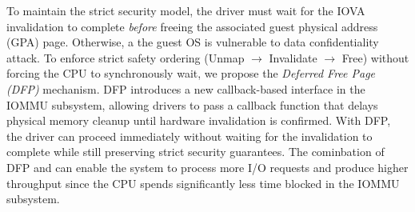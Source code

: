 
To maintain the strict security model, 
the driver must wait for the IOVA invalidation to complete \emph{before} freeing the associated guest physical address (GPA) page.
Otherwise, a the guest OS is vulnerable to data confidentiality attack\cite{RajapakshaIOMMU}.
To enforce strict safety ordering (Unmap $\rightarrow$ Invalidate $\rightarrow$ Free)
without forcing the CPU to synchronously wait,
we propose the \emph{Deferred Free Page (DFP)} mechanism.
DFP introduces a new callback-based interface in the IOMMU subsystem,
allowing drivers to pass a callback function
that delays physical memory cleanup until hardware invalidation is confirmed.
With DFP, the driver can proceed immediately without waiting for the invalidation to complete
while still preserving strict security guarantees.
The cominbation of DFP and \optOne can enable the system to process more I/O requests and produce higher throughput
since the CPU spends significantly less time blocked in the IOMMU subsystem.

